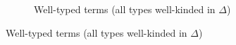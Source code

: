 \begin{figure}
\begin{subfigure}{\linewidth}
  \caption{Well-typed terms (all types well-kinded in $\Delta$)}
\end{subfigure}
\label{fig:typing}
\end{figure}
